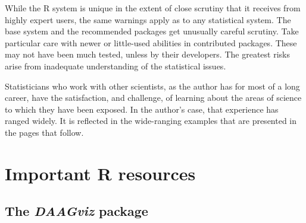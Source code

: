 \begin{fullwidth}
While the R system is unique in the extent of close scrutiny that it
receives from highly expert users, the same warnings apply as to any
statistical system.  The base system and the recommended
  packages get unusually careful scrutiny.  Take particular care 
  with newer or little-used abilities 
in contributed packages.  These may not have been much tested, 
unless by their developers.  The greatest risks arise from 
inadequate understanding of the statistical issues.

Statisticians who work with other scientists, as the author has
for most of a long career, have the satisfaction, and challenge, of
learning about the areas of science to which they have been exposed.
In the author's case, that experience has ranged widely.  It is
reflected in the wide-ranging examples that are presented in the
pages that follow.
\end{fullwidth}

\newpage
\section*{Important R resources}

\noindent
{}


\subsection*{The {\em DAAGviz} package}

